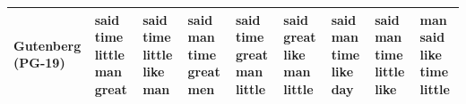 \documentclass[11pt,a4paper]{article}
\begin{document}
\begin{appendices}
\begin{table}[htp]
\begin{tiny}
\begin{tabular}{|p{}|p{}|p{}|p{}|p{}|p{}|p{}|p{}|p{}|}
Gutenberg (PG-19) & said \newline time \newline little \newline man \newline great & said \newline time \newline little \newline like \newline man & said \newline man \newline time \newline great \newline men & said \newline time \newline great \newline man \newline little & said \newline great \newline like \newline man \newline little & said \newline man \newline time \newline like \newline day & said \newline man \newline time \newline little \newline like & man \newline said \newline like \newline time \newline little\\\hline

\end{tabular}
\end{tiny}
\end{table}
\end{appendices}
\end{document}
